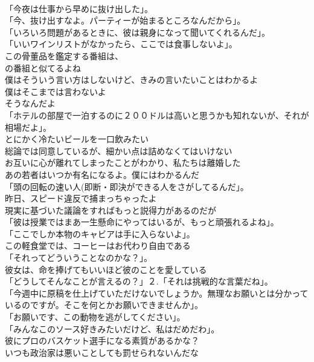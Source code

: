 \documentclass[8pt]{extreport}
\begin{document}
\begin{CJK}{UTF8}{min}
\\	「今夜は仕事から早めに抜け出した」。	
\\	「今、抜け出すなよ。パーティーが始まるところなんだから」。	
\\	「いろいろ問題があるときに、彼は親身になって聞いてくれるんだ」。	
\\	「いいワインリストがなかったら、ここでは食事しないよ」。	
\\	この骨董品を鑑定する番組は、
\\	の番組と似てるよね	
\\	僕はそういう言い方はしないけど、きみの言いたいことはわかるよ	
\\	僕はそこまでは言わないよ	
\\	そうなんだよ	
\\	「ホテルの部屋で一泊するのに２００ドルは高いと思うかも知れないが、それが相場だよ」。	
\\	とにかく冷たいビールを一口飲みたい	
\\	総論では同意しているが、細かい点は詰めなくてはいけない	
\\	お互いに心が離れてしまったことがわかり、私たちは離婚した	
\\	あの若者はいつか有名になるよ。僕にはわかるんだ	
\\	「頭の回転の速い人(即断・即決ができる人をさがしてるんだ」。	
\\	昨日、スピード違反で捕まっちゃったよ	
\\	現実に基づいた議論をすればもっと説得力があるのだが	
\\	「彼は授業ではまあ一生懸命にやってはいるが、もっと頑張れるよね」。	
\\	「ここでしか本物のキャビアは手に入らないよ」。	
\\	この軽食堂では、コーヒーはお代わり自由である	
\\	「それってどういうことなのかな？」。	
\\	彼女は、命を捧げてもいいほど彼のことを愛している	
\\	「どうしてそんなことが言えるの？」２.「それは挑戦的な言葉だね」。	
\\	「今週中に原稿を仕上げていただけないでしょうか。無理なお願いとは分かっているのですが。そこを何とかお願いできませんか」。	
\\	「お願いです、この動物を逃がしてください」。	
\\	「みんなこのソース好きみたいだけど、私はだめだわ」。	
\\	彼にプロのバスケット選手になる素質があるかな？	
\\	いつも政治家は悪いことしても罰せられないんだな	

\end{CJK}
\end{document}
